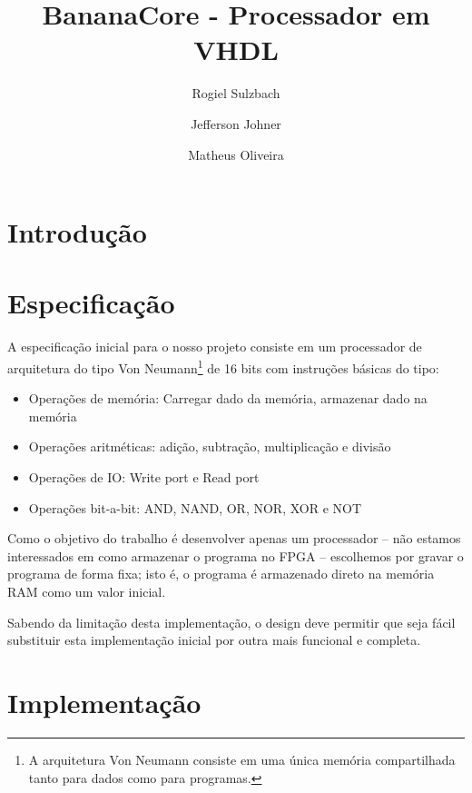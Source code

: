 \documentclass[11pt]{report}
\begin{document}
\title{BananaCore - Processador em VHDL}
\author{
  Rogiel Sulzbach\\
  \and
  Jefferson Johner\\
  \and
  Matheus Oliveira\\
}

\maketitle
\tableofcontents

\chapter{Introdução}

\chapter{Especificação}

A especificação inicial para o nosso projeto consiste em um processador de arquitetura do tipo Von Neumann\footnote{A arquitetura Von Neumann consiste em uma única memória compartilhada tanto para dados como para programas.} de 16 bits com instruções básicas do tipo:

\begin{itemize}
	\item Operações de memória: Carregar dado da memória, armazenar dado na memória
	\item Operações aritméticas: adição, subtração, multiplicação e divisão
	\item Operações de IO: Write port e Read port
	\item Operações bit-a-bit: AND, NAND, OR, NOR, XOR e NOT
\end{itemize}

Como o objetivo do trabalho é desenvolver apenas um processador -- não estamos interessados em como armazenar o programa no FPGA -- escolhemos por gravar o programa de forma fixa; isto é, o programa é armazenado direto na memória RAM como um valor inicial.

Sabendo da limitação desta implementação, o design deve permitir que seja fácil substituir esta implementação inicial por outra mais funcional e completa.

\chapter{Implementação}
\end{document}
